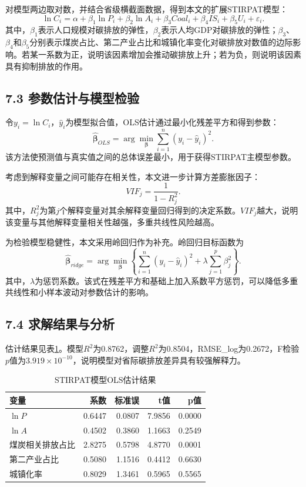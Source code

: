 \documentclass[UTF8,zihao=-4,fontset=windows]{ctexart}
\begin{document}
对模型两边取对数，并结合省级横截面数据，得到本文的扩展STIRPAT模型：
\[
\ln C_i=\alpha+\beta_1\ln P_i+\beta_2\ln A_i+\beta_3Coal_i+\beta_4IS_i+\beta_5U_i+\varepsilon_i.
\]
其中，$\beta_1$表示人口规模对碳排放的弹性，$\beta_2$表示人均GDP对碳排放的弹性；$\beta_3$、$\beta_4$和$\beta_5$分别表示煤炭占比、第二产业占比和城镇化率变化对碳排放对数值的边际影响。若某一系数为正，说明该因素增加会推动碳排放上升；若为负，则说明该因素具有抑制排放的作用。

\subsection*{7.3 参数估计与模型检验}

令$y_i=\ln C_i$，$\hat{y}_i$为模型拟合值，OLS估计通过最小化残差平方和得到参数：
\[
\hat{\boldsymbol\beta}_{OLS}=\arg\min_{\boldsymbol\beta}\sum_{i=1}^{n}(y_i-\hat{y}_i)^2.
\]
该方法使预测值与真实值之间的总体误差最小，用于获得STIRPAT主模型参数。

考虑到解释变量之间可能存在相关性，本文进一步计算方差膨胀因子：
\[
VIF_j=\frac{1}{1-R_j^2}.
\]
其中，$R_j^2$为第$j$个解释变量对其余解释变量回归得到的决定系数。$VIF_j$越大，说明该变量与其他解释变量相关性越强，多重共线性风险越高。

为检验模型稳健性，本文采用岭回归作为补充。岭回归目标函数为
\[
\hat{\boldsymbol\beta}_{ridge}
=\arg\min_{\boldsymbol\beta}\left\{\sum_{i=1}^{n}(y_i-\hat{y}_i)^2+\lambda\sum_{j=1}^{p}\beta_j^2\right\}.
\]
其中，$\lambda$为惩罚系数。该式在残差平方和基础上加入系数平方惩罚，可以降低多重共线性和小样本波动对参数估计的影响。

\subsection*{7.4 求解结果与分析}

估计结果见表\ref{tab:ols}。模型$R^2$为0.8762，调整$R^2$为0.8504，RMSE\_log为0.2672，F检验$p$值为$3.919\times10^{-10}$，说明模型对省际碳排放差异具有较强解释力。

\begin{table}[H]
\centering
\caption{STIRPAT模型OLS估计结果}
\label{tab:ols}
\begin{tabular}{lrrrr}
\toprule
变量 & 系数 & 标准误 & t值 & p值 \\
\midrule
$\ln P$ & 0.6447 & 0.0807 & 7.9856 & 0.0000 \\
$\ln A$ & 0.4502 & 0.3860 & 1.1663 & 0.2549 \\
煤炭相关排放占比 & 2.8275 & 0.5798 & 4.8770 & 0.0001 \\
第二产业占比 & 0.5080 & 1.1516 & 0.4412 & 0.6630 \\
城镇化率 & 0.8029 & 1.3461 & 0.5965 & 0.5565 \\
\bottomrule
\end{tabular}
\end{table}
\end{document}
